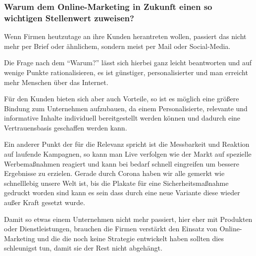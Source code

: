 \begin{refsection}
  
  \subsubsection*{Warum dem Online-Marketing in Zukunft einen so wichtigen Stellenwert zuweisen?}
  Wenn Firmen heutzutage an ihre Kunden herantreten wollen, passiert das nicht mehr per Brief oder ähnlichem, sondern meist per Mail oder Social-Media.

Die Frage nach dem \enquote{Warum?} lässt sich hierbei ganz leicht beantworten und auf wenige Punkte rationalisieren, es ist günstiger, personalisierter und man erreicht mehr Menschen über das Internet.

Für den Kunden bieten sich aber auch Vorteile, so ist es möglich eine grö\ss{}ere Bindung zum Unternehmen aufzubauen, da einem Personalisierte, relevante und informative Inhalte individuell bereitgestellt werden können und dadurch eine Vertrauensbasis geschaffen
werden kann.

Ein anderer Punkt der für die Relevanz spricht ist die Messbarkeit und Reaktion auf laufende Kampagnen, so kann man Live verfolgen wie der Markt auf spezielle Werbema\ss{}nahmen reagiert und kann bei bedarf schnell eingreifen um bessere Ergebnisse zu erzielen.
Gerade durch Corona haben wir alle gemerkt wie schnelllebig unsere Welt ist, bis die Plakate für eine Sicherheitsma\ss{}nahme gedruckt worden sind kann es sein dass durch eine neue Variante diese wieder au\ss{}er Kraft gesetzt wurde.

Damit so etwas einem Unternehmen nicht mehr passiert, hier eher mit Produkten oder Dienstleistungen, brauchen die Firmen verstärkt den Einsatz von Online-Marketing und die die noch keine Strategie entwickelt haben sollten dies schleunigst tun, damit sie der Rest nicht abgehängt.
  \clearpage
  \printbibliography[heading=subsubbibliography]
\end{refsection}
\clearpage
